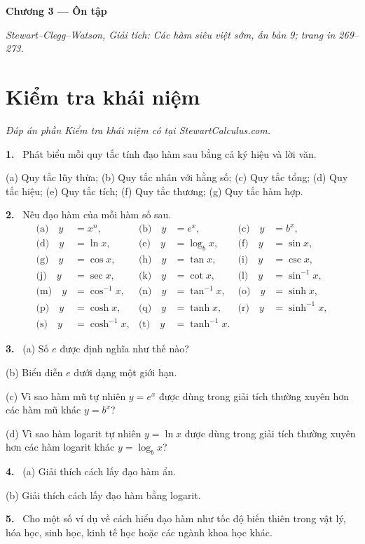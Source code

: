 \documentclass[12pt,a4paper]{article}
\newcommand{\cc}[1]{\par\medskip\noindent\textbf{#1.}\ }
\begin{document}
\begin{center}{\Large\bfseries Chương 3 — Ôn tập}\end{center}
\noindent\textit{Stewart–Clegg–Watson, Giải tích: Các hàm siêu việt sớm, ấn bản 9; trang in 269–273.}

\section*{Kiểm tra khái niệm}
\noindent\textit{Đáp án phần Kiểm tra khái niệm có tại StewartCalculus.com.}

\cc{1} Phát biểu mỗi quy tắc tính đạo hàm sau bằng cả ký hiệu và lời văn.

(a) Quy tắc lũy thừa; (b) Quy tắc nhân với hằng số; (c) Quy tắc tổng; (d) Quy tắc hiệu; (e) Quy tắc tích; (f) Quy tắc thương; (g) Quy tắc hàm hợp.

\cc{2} Nêu đạo hàm của mỗi hàm số sau.
\begin{align*}
\text{(a)}\quad y&=x^n,&\text{(b)}\quad y&=e^x,&\text{(c)}\quad y&=b^x,\\
\text{(d)}\quad y&=\ln x,&\text{(e)}\quad y&=\log_bx,&\text{(f)}\quad y&=\sin x,\\
\text{(g)}\quad y&=\cos x,&\text{(h)}\quad y&=\tan x,&\text{(i)}\quad y&=\csc x,\\
\text{(j)}\quad y&=\sec x,&\text{(k)}\quad y&=\cot x,&\text{(l)}\quad y&=\sin^{-1}x,\\
\text{(m)}\quad y&=\cos^{-1}x,&\text{(n)}\quad y&=\tan^{-1}x,&\text{(o)}\quad y&=\sinh x,\\
\text{(p)}\quad y&=\cosh x,&\text{(q)}\quad y&=\tanh x,&\text{(r)}\quad y&=\sinh^{-1}x,\\
\text{(s)}\quad y&=\cosh^{-1}x,&\text{(t)}\quad y&=\tanh^{-1}x.
\end{align*}
\cc{3} (a) Số $e$ được định nghĩa như thế nào?

(b) Biểu diễn $e$ dưới dạng một giới hạn.

(c) Vì sao hàm mũ tự nhiên $y=e^x$ được dùng trong giải tích thường xuyên hơn các hàm mũ khác $y=b^x$?

(d) Vì sao hàm logarit tự nhiên $y=\ln x$ được dùng trong giải tích thường xuyên hơn các hàm logarit khác $y=\log_bx$?

\cc{4} (a) Giải thích cách lấy đạo hàm ẩn.

(b) Giải thích cách lấy đạo hàm bằng logarit.

\cc{5} Cho một số ví dụ về cách hiểu đạo hàm như tốc độ biến thiên trong vật lý, hóa học, sinh học, kinh tế học hoặc các ngành khoa học khác.
\end{document}
